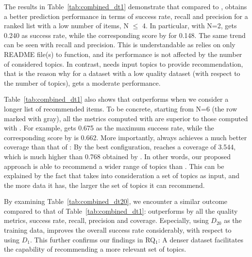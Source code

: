 The results in Table~\ref{tab:combined_dt1} demonstrate that compared to \TF, \MNB obtains a better prediction performance in terms of success rate, recall and precision for a ranked list with a low number of items, \ie N $\leq$ 4. In particular, with N=2, \MNB gets 0.240 as success rate, while the corresponding score by \TF for 0.148. The same trend can be seen with recall and precision. This is understandable as \MNB relies on only README file(s) to function, and its performance is not affected by the number of considered topics. In contrast, \TF needs input topics to provide recommendation, that is the reason why for a dataset with a low quality dataset (with respect to the number of topics), \TF gets a moderate performance. %

Table~\ref{tab:combined_dt1} also shows that \TF outperforms \MNB when we consider a longer list of recommended items. To be concrete, starting from N=6 (\ie the row marked with gray), all the metrics computed with \TF are superior to those computed with \MNB. For example, \TF gets 0.675 as the maximum success rate, while the corresponding score by \MNB is 0.662. More importantly, \TF always achieves a much better coverage than that of \MNB: By the best configuration, \TF reaches a coverage of 3.544, which is much higher than 0.768 obtained by \MNB. In other words, our proposed approach is able to recommend a wider range of topics than \MNB. This can be explained by the fact that \TF takes into consideration a set of topics as input, and the more data it has, the larger the set of topics it can recommend.

By examining Table~\ref{tab:combined_dt20}, we encounter a similar outcome compared to that of Table~\ref{tab:combined_dt1}: \TF outperforms \MNB by all the quality metrics, \ie success rate, recall, precision and coverage. Especially, using $D_{20}$ as the training data, \TF improves the overall success rate considerably, with respect to using $D_{1}$. This further confirms our findings in RQ$_1$: A denser dataset facilitates the capability of recommending a more relevant set of topics. %

